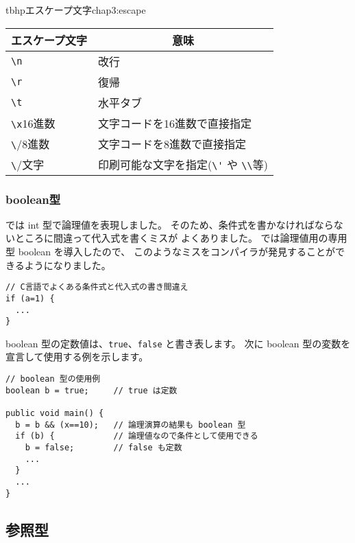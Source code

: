 \begin{mytable}{tbhp}{エスケープ文字}{chap3:escape}
\begin{tabular}{ll}
\hline
\multicolumn{1}{c}{エスケープ文字} & \multicolumn{1}{c}{意味} \\
\hline
\verb/\n/ & 改行 \\
\verb/\r/ & 復帰 \\
\verb/\t/ & 水平タブ \\
\verb/\x/16進数 & 文字コードを16進数で直接指定 \\
\verb/\/8進数 & 文字コードを8進数で直接指定 \\
\verb/\/文字 & 印刷可能な文字を指定(\verb/\'/ や \verb/\\/等) \\
\hline
\end{tabular}
\end{mytable}

\subsubsection{boolean型}

\cl では int 型で論理値を表現しました。
そのため、条件式を書かなければならないところに間違って代入式を書くミスが
よくありました。
\cmml では論理値用の専用型 boolean を導入したので、
このようなミスをコンパイラが発見することができるようになりました。

\begin{mylist}
\begin{verbatim}
// C言語でよくある条件式と代入式の書き間違え
if (a=1) {
  ...
}
\end{verbatim}
\end{mylist}

boolean 型の定数値は、\verb/true/、\verb/false/ と書き表します。
次に boolean 型の変数を宣言して使用する例を示します。

\begin{mylist}
\begin{verbatim}
// boolean 型の使用例
boolean b = true;     // true は定数

public void main() {
  b = b && (x==10);   // 論理演算の結果も boolean 型
  if (b) {            // 論理値なので条件として使用できる
    b = false;        // false も定数
    ...
  }
  ...
}
\end{verbatim}
\end{mylist}


\subsection{参照型}
\label{chap3:ref}

